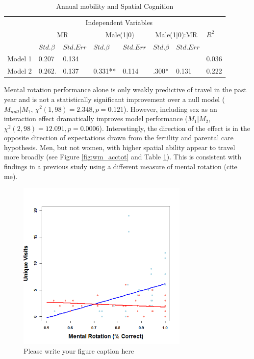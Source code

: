 \begin{table}[!tb]
\caption {Annual mobility and Spatial Cognition}
\label{tab:wm_spacemob}
  \centering
  \begin{tabular}{| l  ll  ll  ll  l |} 
    \hline   
  & \multicolumn{6}{c}{Independent Variables}& \\    
  & \multicolumn{2}{c}{MR} & \multicolumn{2}{c}{Male(1$|$0)} & \multicolumn{2}{c}{Male(1$|$0):MR} & $R^2$ \\
  & $Std. \beta$ & $Std. Err$ & $Std. \beta$ & $Std. Err$ & $Std. \beta$ & $Std. Err$  & \\
  Model 1 & 0.207\phantom{**} & 0.134\phantom{**} & & & & & 0.036\phantom{**} \\
  Model 2 & 0.262. & 0.137\phantom{**} & 0.331** & 0.114\phantom{**} & .300* & 0.131\phantom{**} & 0.222\\
  \hline 
  \end{tabular}  
{}
\end{table}

Mental rotation performance alone is only weakly predictive of travel in the past year and is not a statistically significant improvement over a null model ($M_{null} | M_1$, $\chi^2(1, 98) = 2.348, p = 0.121$).  However, including sex as an interaction effect dramatically improves model performance ($M_1 | M_2$, $\chi^2(2, 98) = 12.091, p = 0.0006$).  Interestingly, the direction of the effect is in the opposite direction of expectations drawn from the fertility and parental care hypothesis.  Men, but not women, with higher spatial ability appear to travel more broadly (see Figure \ref{fig:wm_acctot} and Table \ref{tab:wm_spacemob}).  This is consistent with findings in a previous study using a different measure of mental rotation (cite me).

\begin{figure}[!htb]
  \includegraphics[width=0.75\textwidth]{mw_acctot}
\caption{Please write your figure caption here}
\label{fig:1}       %
\end{figure}

